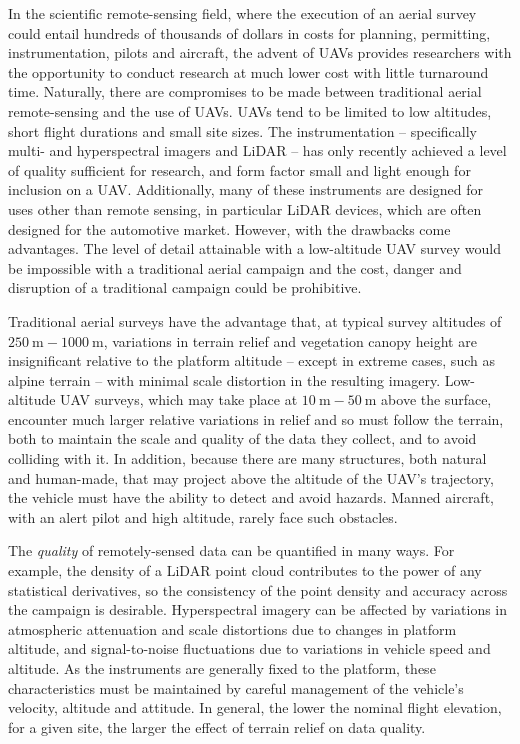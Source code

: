 In the scientific remote-sensing field, where the execution of an aerial survey could entail hundreds of thousands of dollars in costs for planning, permitting, instrumentation, pilots and aircraft, the advent of UAVs provides researchers with the opportunity to conduct research at much lower cost with little turnaround time. Naturally, there are compromises to be made between traditional aerial remote-sensing and the use of UAVs. UAVs tend to be limited to low altitudes, short flight durations and small site sizes. The instrumentation -- specifically multi- and hyperspectral imagers and LiDAR -- has only recently achieved a level of quality sufficient for research, and form factor small and light enough for inclusion on a UAV. Additionally, many of these instruments are designed for uses other than remote sensing, in particular LiDAR devices, which are often designed for the automotive market. However, with the drawbacks come advantages. The level of detail attainable with a low-altitude UAV survey would be impossible with a traditional aerial campaign and the cost, danger and disruption of a traditional campaign could be prohibitive.

Traditional aerial surveys have the advantage that, at typical survey altitudes of $\SI{250}\m-\SI{1000}\m$, variations in terrain relief and vegetation canopy height are insignificant relative to the platform altitude -- except in extreme cases, such as alpine terrain -- with minimal scale distortion in the resulting imagery. Low-altitude UAV surveys, which may take place at $\SI{10}\m-\SI{50}\m$ above the surface, encounter much larger relative variations in relief and so must follow the terrain, both to maintain the scale and quality of the data they collect, and to avoid colliding with it. In addition, because there are many structures, both natural and human-made, that may project above the altitude of the UAV's trajectory, the vehicle must have the ability to detect and avoid hazards. Manned aircraft, with an alert pilot and high altitude, rarely face such obstacles. 

The \emph{quality} of remotely-sensed data can be quantified in many ways. For example, the density of a LiDAR point cloud contributes to the power of any statistical derivatives, so the consistency of the point density and accuracy across the campaign is desirable. Hyperspectral imagery can be affected by variations in atmospheric attenuation and scale distortions due to changes in platform altitude, and signal-to-noise fluctuations due to variations in vehicle speed and altitude. As the instruments are generally fixed to the platform, these characteristics must be maintained by careful management of the vehicle's velocity, altitude and attitude. In general, the lower the nominal flight elevation, for a given site, the larger the effect of terrain relief on data quality.


